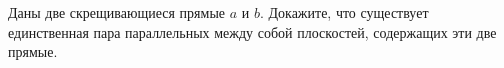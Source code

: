 Даны две скрещивающиеся прямые $a$ и $b$. Докажите, что существует единственная пара параллельных между собой плоскостей, содержащих эти две прямые.